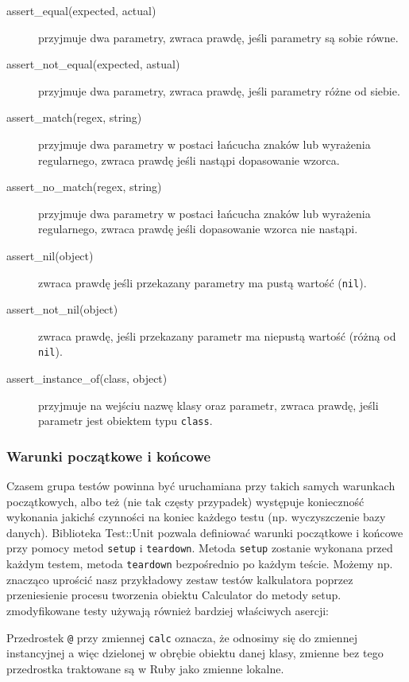      \begin{description}
       \item[assert\_equal(expected, actual)] przyjmuje dwa parametry, zwraca prawdę, jeśli parametry są sobie równe.
       \item[assert\_not\_equal(expected, astual)] przyjmuje dwa parametry, zwraca prawdę, jeśli parametry różne od siebie.
       \item[assert\_match(regex, string)] przyjmuje dwa parametry w postaci łańcucha znaków lub wyrażenia regularnego, zwraca prawdę jeśli nastąpi dopasowanie wzorca.
       \item[assert\_no\_match(regex, string)] przyjmuje dwa parametry w postaci łańcucha znaków lub wyrażenia regularnego, zwraca prawdę jeśli dopasowanie wzorca nie nastąpi.
       \item[assert\_nil(object)] zwraca prawdę jeśli przekazany parametry ma pustą wartość (\texttt{nil}).
       \item[assert\_not\_nil(object)] zwraca prawdę, jeśli przekazany parametr ma niepustą wartość (różną od \texttt{nil}).
       \item[assert\_instance\_of(class, object)] przyjmuje na wejściu nazwę klasy oraz parametr, zwraca prawdę, jeśli parametr jest obiektem typu \texttt{class}.
    \end{description}
    
    \subsubsection{Warunki początkowe i końcowe}
    Czasem grupa testów powinna być uruchamiana przy takich samych warunkach początkowych, albo też (nie tak częsty przypadek) występuje konieczność wykonania jakichś czynności na koniec każdego testu (np. wyczyszczenie bazy danych). Biblioteka Test::Unit pozwala definiować warunki początkowe i końcowe przy pomocy metod \texttt{setup} i \texttt{teardown}.
    Metoda \texttt{setup} zostanie wykonana przed każdym testem, metoda \texttt{teardown} bezpośrednio po każdym teście. Możemy np. znacząco uprościć nasz przykładowy zestaw testów kalkulatora poprzez przeniesienie procesu tworzenia obiektu Calculator do metody setup. zmodyfikowane testy używają również bardziej właściwych asercji:
    
    
    
    Przedrostek \texttt{@} przy zmiennej \texttt{calc} oznacza, że odnosimy się do zmiennej instancyjnej a więc dzielonej w obrębie obiektu danej klasy, zmienne bez tego przedrostka traktowane są w Ruby jako zmienne lokalne.
    
